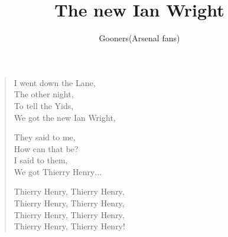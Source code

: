 \documentclass[a4paper,12pt]{article}
\title{The new Ian Wright}
\author{Gooners(Arsenal fans)}
\date{}
\begin{document}
	
	\maketitle
	
	\begin{verse}
		
		I went down the Lane, \\
		The other night, \\
		To tell the Yids, \\
		We got the new Ian Wright,\par 
		They said to me, \\
		How can that be? \\
		I said to them, \\
		We got Thierry Henry$\ldots$\par 
		Thierry Henry, Thierry Henry, \\
		Thierry Henry, Thierry Henry, \\
		Thierry Henry, Thierry Henry, \\
		Thierry Henry, Thierry Henry! 
		
	\end{verse}
	
\end{document}
